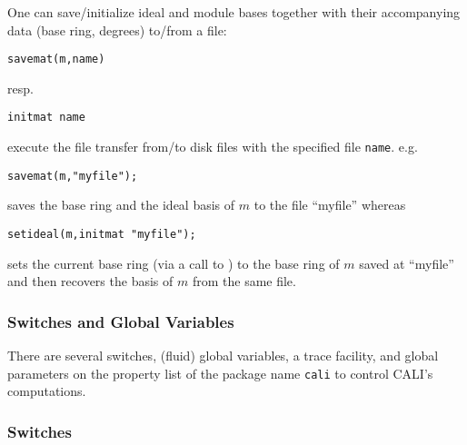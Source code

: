 One can save/initialize ideal and module bases together with their
accompanying data (base ring, degrees) to/from a file:
\begin{verbatim}
savemat(m,name)
\end{verbatim}
resp.
\begin{verbatim}
initmat name
\end{verbatim} execute the file transfer from/to disk files with the
specified file \texttt{name}. e.g.\
\begin{verbatim}
savemat(m,"myfile");
\end{verbatim}
saves the base ring and the ideal basis of $m$ to the file ``myfile''
whereas
\begin{verbatim}
setideal(m,initmat "myfile");
\end{verbatim}
sets the current base ring (via a call to ) to the base
ring of $m$ saved at ``myfile'' and then recovers the basis of $m$
from the same file.

\subsubsection{Switches and Global Variables}

There are several switches, (fluid) global variables, a trace
facility, and global parameters on the property list of the package
name \texttt{cali} to control CALI's computations.
\medskip

\subsubsection*{Switches}

